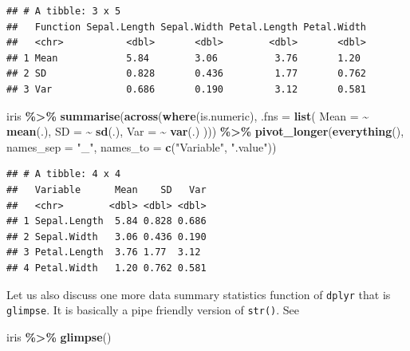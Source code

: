 \documentclass[
]{book}
\newenvironment{Shaded}{\begin{snugshade}}{\end{snugshade}}
\newcommand{\AttributeTok}[1]{\textcolor[rgb]{0.13,0.29,0.53}{#1}}
\newcommand{\FunctionTok}[1]{\textcolor[rgb]{0.13,0.29,0.53}{\textbf{#1}}}
\newcommand{\NormalTok}[1]{#1}
\newcommand{\SpecialCharTok}[1]{\textcolor[rgb]{0.81,0.36,0.00}{\textbf{#1}}}
\newcommand{\StringTok}[1]{\textcolor[rgb]{0.31,0.60,0.02}{#1}}
\begin{document}
\begin{verbatim}
## # A tibble: 3 x 5
##   Function Sepal.Length Sepal.Width Petal.Length Petal.Width
##   <chr>           <dbl>       <dbl>        <dbl>       <dbl>
## 1 Mean            5.84        3.06          3.76       1.20 
## 2 SD              0.828       0.436         1.77       0.762
## 3 Var             0.686       0.190         3.12       0.581
\end{verbatim}

\begin{Shaded}
\begin{Highlighting}[]
\NormalTok{iris }\SpecialCharTok{\%\textgreater{}\%}
  \FunctionTok{summarise}\NormalTok{(}\FunctionTok{across}\NormalTok{(}\FunctionTok{where}\NormalTok{(is.numeric),}
                   \AttributeTok{.fns =} \FunctionTok{list}\NormalTok{(}
                     \AttributeTok{Mean =} \SpecialCharTok{\textasciitilde{}} \FunctionTok{mean}\NormalTok{(.),}
                     \AttributeTok{SD =} \SpecialCharTok{\textasciitilde{}} \FunctionTok{sd}\NormalTok{(.),}
                     \AttributeTok{Var =} \SpecialCharTok{\textasciitilde{}} \FunctionTok{var}\NormalTok{(.)}
\NormalTok{                   ))) }\SpecialCharTok{\%\textgreater{}\%}
  \FunctionTok{pivot\_longer}\NormalTok{(}\FunctionTok{everything}\NormalTok{(),}
               \AttributeTok{names\_sep =} \StringTok{"\_"}\NormalTok{,}
               \AttributeTok{names\_to =} \FunctionTok{c}\NormalTok{(}\StringTok{"Variable"}\NormalTok{, }\StringTok{".value"}\NormalTok{))}
\end{Highlighting}
\end{Shaded}

\begin{verbatim}
## # A tibble: 4 x 4
##   Variable      Mean    SD   Var
##   <chr>        <dbl> <dbl> <dbl>
## 1 Sepal.Length  5.84 0.828 0.686
## 2 Sepal.Width   3.06 0.436 0.190
## 3 Petal.Length  3.76 1.77  3.12 
## 4 Petal.Width   1.20 0.762 0.581
\end{verbatim}

Let us also discuss one more data summary statistics function of \texttt{dplyr} that is \texttt{glimpse}. It is basically a pipe friendly version of \texttt{str()}. See

\begin{Shaded}
\begin{Highlighting}[]
\NormalTok{iris }\SpecialCharTok{\%\textgreater{}\%} 
  \FunctionTok{glimpse}\NormalTok{()}
\end{Highlighting}
\end{Shaded}
\end{document}
